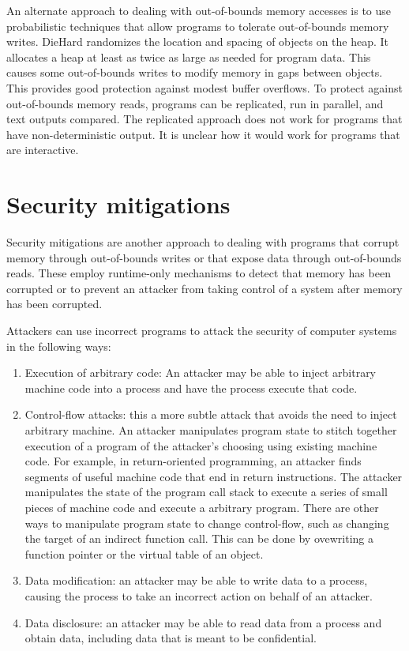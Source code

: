 An alternate approach to dealing with out-of-bounds memory accesses is to
use probabilistic techniques that allow programs to tolerate out-of-bounds
memory writes.   DieHard \cite{Berger2006} randomizes the location and spacing of 
objects on the heap.  It allocates a heap at least as twice as large as needed for
program data.    This causes some out-of-bounds writes to modify memory in gaps
between objects.  This provides good protection against modest buffer overflows. 
To protect against out-of-bounds memory reads, programs
can be replicated, run in parallel, and text outputs compared.  The replicated
approach does not work for programs that have non-deterministic output. It is 
unclear how it would work for programs that are interactive.

\section{Security mitigations}
Security mitigations are another approach to dealing with programs that corrupt memory
through out-of-bounds writes or that expose data through out-of-bounds
reads.   These employ runtime-only mechanisms to detect that memory has been
corrupted or to prevent an attacker from taking control of a system after
memory has been corrupted.

Attackers can use incorrect programs to attack the security of 
computer systems in the following ways:
\begin{enumerate}
\item  Execution of arbitrary code: An attacker may be able to inject arbitrary machine code into a process and have the process  execute that code.
\item Control-flow attacks: this a more subtle attack that avoids the need to inject arbitrary machine.  An attacker manipulates program state to
stitch together execution of a program of the attacker's choosing
using existing machine code.
For example, in return-oriented programming, an attacker finds segments of useful
machine code that end in return instructions. The attacker manipulates the state of 
the program call  stack to execute a series of small pieces of machine code and execute
a arbitrary program.  There are other ways to manipulate program state to
change control-flow, such as changing the target of an indirect function call.  
This can be done by 
ovewriting a function pointer or the virtual table of an object.
\item Data modification: an attacker may be able to write data to a process, causing the process to take an incorrect action on behalf of an attacker.
\item  Data disclosure: an attacker may be able to read data from a process 
and obtain data, including data that is meant to be confidential.  
\end{enumerate}

